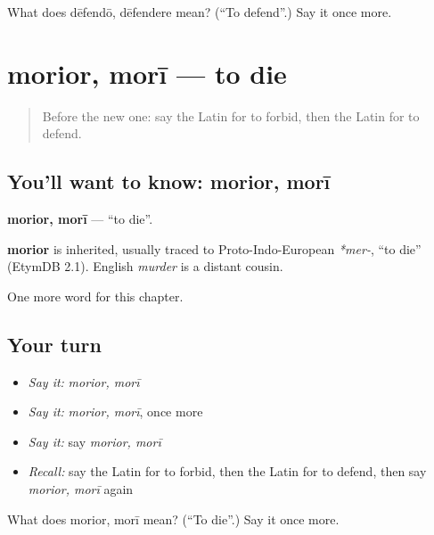\begin{tcolorbox}[breakable,colback=teal!4,colframe=teal!35!black,title={Before you move on}]
What does dēfendō, dēfendere mean? (\textquotedblleft{}To defend\textquotedblright{}.) Say it once more.
\end{tcolorbox}
\section[morior, morī]{morior, morī — to die}

\label{lesson:LA-C198-morior}



\begin{quote}
Before the new one: say the Latin for to forbid, then the Latin for to defend.
\end{quote}

\subsection*{You'll want to know: morior, morī}
\textbf{morior, morī} — \textquotedblleft{}to die\textquotedblright{}.

\begin{cousinweb}
\textbf{morior} is inherited, usually traced to Proto-Indo-European \emph{*mer-}, \textquotedblleft{}to die\textquotedblright{} (EtymDB 2.1). English \emph{murder} is a distant cousin.
\end{cousinweb}

\begin{grammarlens}[title={What you've built}]
One more word for this chapter.
\end{grammarlens}

\subsection*{Your turn}
\begin{itemize}
\raggedright
  \item \emph{Say it:} \emph{morior, morī}
  \item \emph{Say it:} \emph{morior, morī}, once more
  \item \emph{Say it:} say \emph{morior, morī}
  \item \emph{Recall:} say the Latin for to forbid, then the Latin for to defend, then say \emph{morior, morī} again
\end{itemize}

\begin{tcolorbox}[breakable,colback=teal!4,colframe=teal!35!black,title={Before you move on}]
What does morior, morī mean? (\textquotedblleft{}To die\textquotedblright{}.) Say it once more.
\end{tcolorbox}
